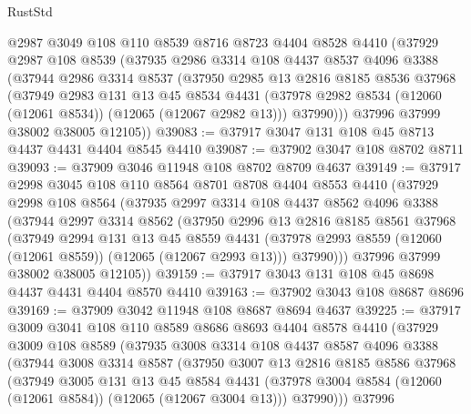 \begin{lexlean}{RustStd}
\begin{coremodule}
    @2987
    @3049
    @108
    @110
    @8539
    @8716
    @8723
    @4404
    @8528
    @4410
    (@37929
      @2987
      @108
      @8539
      (@37935
        @2986
        @3314
        @108
        @4437
        @8537
        @4096
        @3388
        (@37944
          @2986
          @3314
          @8537
          (@37950
            @2985
            @13
            @2816
            @8185
            @8536
            @37968
            (@37949
              @2983
              @131
              @13
              @45
              @8534
              @4431
              (@37978 @2982 @8534 (@12060 (@12061 @8534)) (@12065 (@12067 @2982 @13)))
              @37990)))
        @37996
        @37999
        @38002
        @38005
        @12105))
@39083 := @37917 @3047 @131 @108 @45 @8713 @4437 @4431 @4404 @8545 @4410
@39087 := @37902 @3047 @108 @8702 @8711
@39093 := @37909 @3046 @11948 @108 @8702 @8709 @4637
@39149 := @37917
    @2998
    @3045
    @108
    @110
    @8564
    @8701
    @8708
    @4404
    @8553
    @4410
    (@37929
      @2998
      @108
      @8564
      (@37935
        @2997
        @3314
        @108
        @4437
        @8562
        @4096
        @3388
        (@37944
          @2997
          @3314
          @8562
          (@37950
            @2996
            @13
            @2816
            @8185
            @8561
            @37968
            (@37949
              @2994
              @131
              @13
              @45
              @8559
              @4431
              (@37978 @2993 @8559 (@12060 (@12061 @8559)) (@12065 (@12067 @2993 @13)))
              @37990)))
        @37996
        @37999
        @38002
        @38005
        @12105))
@39159 := @37917 @3043 @131 @108 @45 @8698 @4437 @4431 @4404 @8570 @4410
@39163 := @37902 @3043 @108 @8687 @8696
@39169 := @37909 @3042 @11948 @108 @8687 @8694 @4637
@39225 := @37917
    @3009
    @3041
    @108
    @110
    @8589
    @8686
    @8693
    @4404
    @8578
    @4410
    (@37929
      @3009
      @108
      @8589
      (@37935
        @3008
        @3314
        @108
        @4437
        @8587
        @4096
        @3388
        (@37944
          @3008
          @3314
          @8587
          (@37950
            @3007
            @13
            @2816
            @8185
            @8586
            @37968
            (@37949
              @3005
              @131
              @13
              @45
              @8584
              @4431
              (@37978 @3004 @8584 (@12060 (@12061 @8584)) (@12065 (@12067 @3004 @13)))
              @37990)))
        @37996

\end{coremodule}
\end{lexlean}
